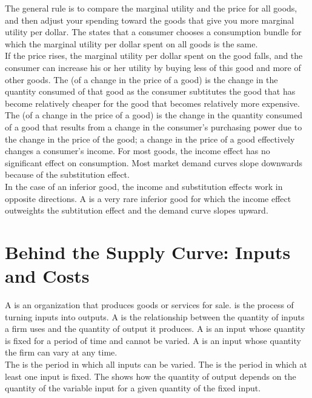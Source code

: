 \documentclass{article}
\begin{document}
The general rule is to compare the marginal utility and the price for all goods, and then adjust your spending toward the goods that give you more marginal utility per dollar. The  states that a consumer chooses a consumption bundle for which the marginal utility per dollar spent on all goods is the same. \\ 

If the price rises, the marginal utility per dollar spent on the good falls, and the consumer can increase his or her utility by buying less of this good and more of other goods. The  (of a change in the price of a good) is the change in the quantity consumed of that good as the consumer subtitutes the good that has become relatively cheaper for the good that becomes relatively more expensive. The  (of a change in the price of a good) is the change in the quantity consumed of a good that results from a change in the consumer's purchasing power due to the change in the price of the good; a change in the price of a good effectively changes a consumer's income. For most goods, the income effect has no significant effect on consumption. Most market demand curves slope downwards because of the substitution effect. \\ 

In the case of an inferior good, the income and substitution effects work in opposite directions. A  is a very rare inferior good for which the income effect outweights the subtitution effect and the demand curve slopes upward. 

\section{Behind the Supply Curve: Inputs and Costs}

A  is an organization that produces goods or services for sale.  is the process of turning inputs into outputs. A  is the relationship between the quantity of inputs a firm uses and the quantity of output it produces. A  is an input whose quantity is fixed for a period of time and cannot be varied. A  is an input whose quantity the firm can vary at any time. \\ 

The  is the period in which all inputs can be varied. The  is the period in which at least one input is fixed. The  shows how the quantity of output depends on the quantity of the variable input for a given quantity of the fixed input. \\ 
\end{document}
